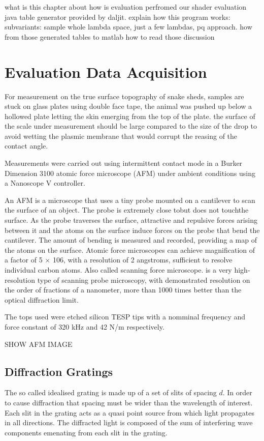 what is this chapter about
how is evaluation perfromed
our shader
evaluation java table generator provided by daljit.
explain how this program works:
subvariants: sample whole lambda space, just a few lambdas, pq approach.
how from those generated tables to matlab
how to read those
discussion


\section{Evaluation Data Acquisition}
For measurement on the true surface topography of snake sheds, samples are stuck on glass plates using double face tape, the animal was pushed up below a hollowed plate letting the skin emerging from the top of the plate. the surface of the scale under measurement should be large compared to the size of the drop to avoid wetting the plasmic membrane that would corrupt the reasing of the contact angle. 

Measurements were carried out using intermittent contact mode in a Burker Dimension 3100 atomic force microscope (AFM) under ambient conditions using a Nanoscope V controller. 

An AFM is a microscope that uses a tiny probe mounted on a cantilever to scan the surface of an object. The probe is extremely close tobut does not touchthe surface. As the probe traverses the surface, attractive and repulsive forces arising between it and the atoms on the surface induce forces on the probe that bend the cantilever. The amount of bending is measured and recorded, providing a map of the atoms on the surface. Atomic force microscopes can achieve magnification of a factor of 5 × 106, with a resolution of 2 angstroms, sufficient to resolve individual carbon atoms. Also called scanning force microscope.
is a very high-resolution type of scanning probe microscopy, with demonstrated resolution on the order of fractions of a nanometer, more than 1000 times better than the optical diffraction limit.

The tops used were etched silicon TESP tips with a nomminal frequency and force constant of 320 kHz and 42 N/m respectively. 

SHOW AFM IMAGE

\subsection{Diffraction Gratings}

The so called idealised grating is made up of a set of slits of spacing $d$. In order to cause diffraction that spacing must be wider than the wavelength of interest. Each slit in the grating acts as a quasi point source from which light propagates in all directions. The diffracted light is composed of the sum of interfering wave components emenating from each slit in the grating. 


